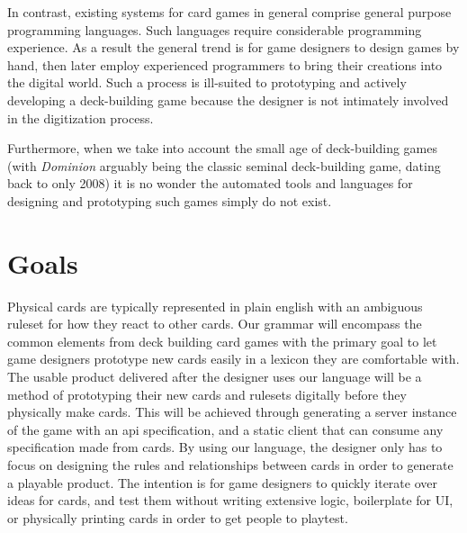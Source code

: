 \documentclass{acm_proc_article-sp}
\begin{document}

In contrast, existing systems for card games in general comprise general
purpose programming languages. Such languages require considerable
programming experience. As a result the general trend is for game designers
to design games by hand, then later employ experienced programmers to
bring their creations into the digital world. Such a process is ill-suited
to prototyping and actively developing a deck-building game because the
designer is not intimately involved in the digitization process.

Furthermore, when we take into account the small age
of deck-building games (with \emph{Dominion} arguably
being the classic seminal deck-building game, dating back to only 2008)
it is no wonder the automated tools and languages for designing and
prototyping such games simply do not exist.

\section{Goals}
\label{sec:goals}
Physical cards are typically represented in plain english with an ambiguous ruleset 
for how they react to other cards. Our grammar will encompass the common elements from 
deck building card games with the primary goal to let game designers prototype new cards
easily in a lexicon they are comfortable with. The usable product delivered after the 
designer uses our language will be a method of prototyping their new cards and rulesets
digitally before they physically make cards. This will be achieved through generating a 
server instance of the game with an api specification, and a static client that can consume
any specification made from cards. By using our language, the designer only has to focus on
designing the rules and relationships between cards in order to generate a playable product.
The intention is for game designers to quickly iterate over ideas for cards, and test them 
without writing extensive logic, boilerplate for UI, or physically printing cards in order to 
get people to playtest.
\end{document}
